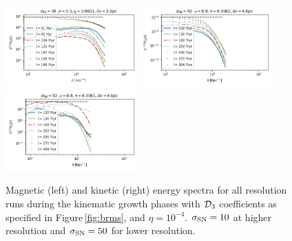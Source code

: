 \documentclass[iop,apj,numberedappendix,twocolappendix]{emulateapj}
\begin{document}
\begin{figure}
\includegraphics[trim=0.0cm 0.00cm 0.0cm 0.0cm,clip=true,width=0.45\textwidth]{csc_figs/2pcPm0e-4_0kpower.png}
\includegraphics[trim=0.0cm 0.00cm 0.0cm 0.0cm,clip=true,width=0.45\textwidth]{csc_figs/4pcPm0e-4_0Bpower.png}
\includegraphics[trim=0.0cm 0.00cm 0.0cm 0.0cm,clip=true,width=0.45\textwidth]{csc_figs/4pcPm0e-4_0kpower.png}
\caption{
Magnetic (left) and kinetic (right) energy spectra for all resolution runs 
during the kinematic growth phases with ${\cal D}_3$ 
coefficients as specified in Figure\,\ref{fig:brms}, and $\eta=10^{-4}$.
$\sigma_{\rm SN}=10$ at higher resolution and $\sigma_{\rm SN}=50$ for lower
resolution.
\label{fig:4spectraRm}
}
\end{figure}
\end{document}

